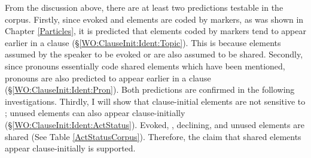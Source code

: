 %
%
%

From the discussion above,
there are at least two predictions testable in the corpus.
Firstly, since evoked and  elements are coded by  markers, as was shown in Chapter \ref{Particles},
it is predicted that
elements coded by  markers tend to appear earlier in a clause (\S \ref{WO:ClauseInit:Ident:Topic}).
This is because elements assumed by the speaker to be evoked or 
are also assumed to be shared.
Secondly,
since pronouns essentially code shared elements which have been mentioned,
pronouns are also predicted to appear earlier in a clause (\S \ref{WO:ClauseInit:Ident:Pron}).
Both predictions are confirmed in the following investigations.
Thirdly, I will show that clause-initial elements are not sensitive to ;
unused elements can also appear clause-initially (\S \ref{WO:ClauseInit:Ident:ActStatus}).
Evoked, , declining, and unused elements are shared
(See Table \ref{ActStatusCorpus}).
Therefore, the claim that shared elements appear clause-initially is supported.

